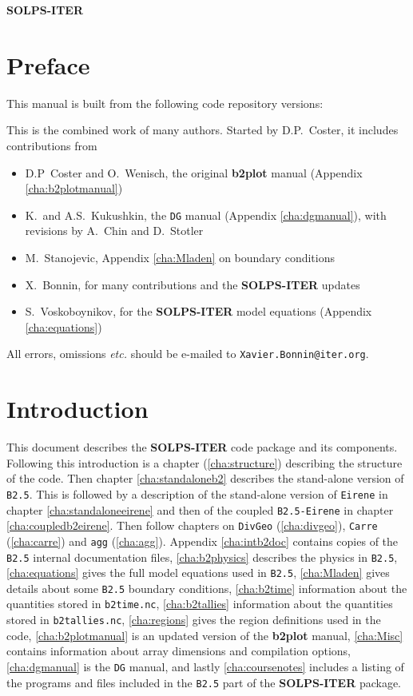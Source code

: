 \documentclass[a4paper,10pt]{report}
\newcommand\SOLPSITER{{\bf SOLPS-ITER} }
\newcommand{\btwoplot}{{\bf b2plot} }
\begin{document}
\mbox{}
\vfill
{\Huge \hfill \SOLPSITER \hfill}
\vfill

\newpage
\tableofcontents
\listoffigures
\listoftables

\chapter*{Preface}
This manual is built from the following code repository versions:

This is the combined work of many authors.  Started by D.P.~Coster, it
includes contributions from
\begin{itemize}
\item D.P~Coster and O.~Wenisch, the original \btwoplot manual (Appendix \ref{cha:b2plotmanual})
\item K.~and A.S.~Kukushkin, the {\tt DG} manual (Appendix \ref{cha:dgmanual}), with revisions by A.~Chin and D.~Stotler
\item M.~Stanojevic, Appendix \ref{cha:Mladen} on boundary conditions
\item X.~Bonnin, for many contributions and the \SOLPSITER updates
\item S.~Voskoboynikov, for the \SOLPSITER model equations (Appendix \ref{cha:equations})
\end{itemize}
All errors, omissions {\it etc.} should be e-mailed to {\tt Xavier.Bonnin@iter.org}.

\chapter{Introduction}
\label{cha:intro}

This document describes the \SOLPSITER code package and its components.
Following this introduction is a chapter (\ref{cha:structure})
describing the structure of the code.  Then chapter
\ref{cha:standaloneb2} describes the stand-alone version of {\tt B2.5}.  This
is followed by a description of the stand-alone version of {\tt Eirene} in
chapter \ref{cha:standaloneeirene} and then of the coupled {\tt B2.5-Eirene}
in chapter \ref{cha:coupledb2eirene}.  Then follow chapters on {\tt DivGeo}
(\ref{cha:divgeo}), {\tt Carre} (\ref{cha:carre}) and {\tt agg} (\ref{cha:agg}).
Appendix \ref{cha:intb2doc} contains copies of the {\tt B2.5} internal
documentation files, \ref{cha:b2physics} describes the physics in {\tt B2.5},
\ref{cha:equations} gives the full model equations used in {\tt B2.5},
\ref{cha:Mladen} gives details about some {\tt B2.5} boundary conditions,
\ref{cha:b2time} information about the quantities stored in {\tt b2time.nc},
\ref{cha:b2tallies} information about the quantities stored in {\tt b2tallies.nc},
\ref{cha:regions} gives the region definitions used in the code,
\ref{cha:b2plotmanual} is an updated
version of the \btwoplot manual, \ref{cha:Misc}
contains information about array dimensions and compilation options,
\ref{cha:dgmanual} is the {\tt DG} manual, and lastly
\ref{cha:coursenotes} includes a listing of the programs and files included
in the {\tt B2.5} part of the \SOLPSITER package.
\end{document}
